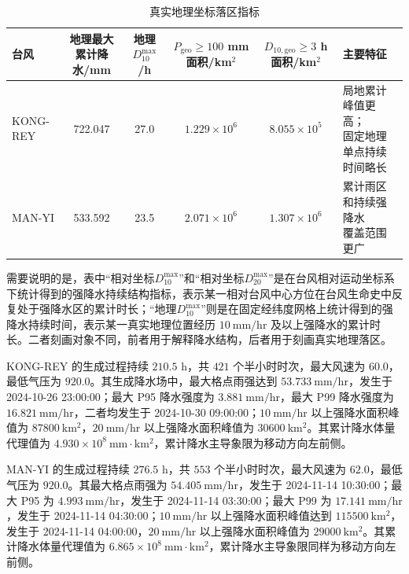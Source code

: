 \documentclass[UTF8,a4paper,zihao=5,fontset=fandol]{ctexart}
\numberwithin{equation}{section}
\numberwithin{figure}{section}
\numberwithin{table}{section}
\begin{document}
\addtocounter{table}{-1}
\renewcommand{\thetable}{\thesection.\arabic{table}B}
\renewcommand{\theHtable}{\thetable}
\begin{table}[H]
\centering
\caption{真实地理坐标落区指标}
\label{tab:p2_final_summary_b}
\small
\setlength{\tabcolsep}{4pt}
\begin{tabularx}{\textwidth}{lcccc>{\raggedright\arraybackslash}X}
\toprule
台风
& \makecell{地理最大\\累计降水/mm}
& \makecell{地理\\$D_{10}^{\max}$/h}
& \makecell{$P_{\mathrm{geo}}\ge100$ mm\\面积/km$^2$}
& \makecell{$D_{10,\mathrm{geo}}\ge3$ h\\面积/km$^2$}
& 主要特征 \\
\midrule
KONG-REY
& 722.047
& 27.0
& $1.229\times 10^6$
& $8.055\times 10^5$
& \makecell[l]{局地累计峰值更高；\\固定地理单点持续时间略长} \\
MAN-YI
& 533.592
& 23.5
& $2.071\times 10^6$
& $1.307\times 10^6$
& \makecell[l]{累计雨区和持续强降水\\覆盖范围更广} \\
\bottomrule
\end{tabularx}
\end{table}
\endgroup

需要说明的是，表中“相对坐标$D_{10}^{\max}$”和“相对坐标$D_{20}^{\max}$”是在台风相对运动坐标系下统计得到的强降水持续结构指标，表示某一相对台风中心方位在台风生命史中反复处于强降水区的累计时长；“地理$D_{10}^{\max}$”则是在固定经纬度网格上统计得到的强降水持续时间，表示某一真实地理位置经历 $10\ \mathrm{mm/hr}$ 及以上强降水的累计时长。二者刻画对象不同，前者用于解释降水结构，后者用于刻画真实地理落区。

KONG-REY 的生成过程持续 $210.5$ h，共 $421$ 个半小时时次，最大风速为 $60.0$，最低气压为 $920.0$。其生成降水场中，最大格点雨强达到 $53.733\ \mathrm{mm/hr}$，发生于 2024-10-26 23:00:00；最大 P95 降水强度为 $3.881\ \mathrm{mm/hr}$，最大 P99 降水强度为 $16.821\ \mathrm{mm/hr}$，二者均发生于 2024-10-30 09:00:00；$10\ \mathrm{mm/hr}$ 以上强降水面积峰值为 $87800\ \mathrm{km^2}$，$20\ \mathrm{mm/hr}$ 以上强降水面积峰值为 $30600\ \mathrm{km^2}$。其累计降水体量代理值为 $4.930\times 10^8\ \mathrm{mm\cdot km^2}$，累计降水主导象限为移动方向左前侧。

MAN-YI 的生成过程持续 $276.5$ h，共 $553$ 个半小时时次，最大风速为 $62.0$，最低气压为 $920.0$。其最大格点雨强为 $54.405\ \mathrm{mm/hr}$，发生于 2024-11-14 10:30:00；最大 P95 为 $4.993\ \mathrm{mm/hr}$，发生于 2024-11-14 03:30:00；最大 P99 为 $17.141\ \mathrm{mm/hr}$，发生于 2024-11-14 04:30:00；$10\ \mathrm{mm/hr}$ 以上强降水面积峰值达到 $115500\ \mathrm{km^2}$，发生于 2024-11-14 04:00:00，$20\ \mathrm{mm/hr}$ 以上强降水面积峰值为 $29000\ \mathrm{km^2}$。其累计降水体量代理值为 $6.865\times 10^8\ \mathrm{mm\cdot km^2}$，累计降水主导象限同样为移动方向左前侧。
\end{document}
